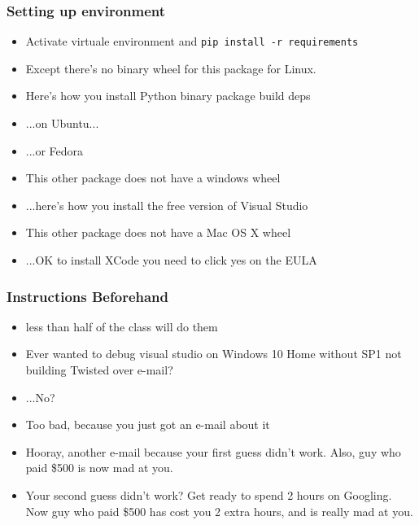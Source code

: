 \begin{frame}[fragile]
\frametitle{Setting up environment}

\begin{itemize}
\item Activate virtuale environment and \verb|pip install -r requirements|
      \pause
\item Except there's no binary wheel for this package for Linux.
      \pause
\item Here's how you install Python binary package build deps
      \pause
\item ...on Ubuntu...
      \pause
\item ...or Fedora
      \pause
\item This other package does not have a windows wheel
      \pause
\item ...here's how you install the free version of Visual Studio
      \pause
\item This other package does not have a Mac OS X wheel
      \pause
\item ...OK to install XCode you need to click yes on the EULA
      \pause
\end{itemize}

\end{frame}

\begin{frame}[fragile]
\frametitle{Instructions Beforehand}

\begin{itemize}
\item less than half of the class will do them
      \pause
\item Ever wanted to debug visual studio on Windows 10 Home
      without SP1 not building Twisted over e-mail?
      \pause
\item ...No?
      \pause
\item Too bad, because you just got an e-mail about it
      \pause
\item Hooray, another e-mail because your first guess didn't work.
      Also, guy who paid \$500 is now mad at you.
      \pause
\item Your second guess didn't work?
      Get ready to spend 2 hours on Googling.
      Now guy who paid \$500 has cost you 2 extra hours,
      and is really mad at you.
\end{itemize}

\end{frame}

